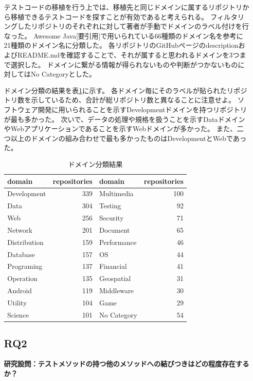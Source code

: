 \documentclass[conference]{IEEEtran}
\begin{document}
テストコードの移植を行う上では、移植先と同じドメインに属するリポジトリから移植できるテストコードを探すことが有効であると考えられる。
フィルタリングしたリポジトリのそれぞれに対して著者が手動でドメインのラベル付けを行なった。
Awesome Java[要引用]で用いられている66種類のドメイン名を参考に21種類のドメイン名に分類した。
各リポジトリのGitHubページのdescriptionおよびREADME.mdを確認することで、それが属すると思われるドメインを3つまで選択した。
ドメインに繋がる情報が得られないものや判断がつかないものに対してはNo Categoryとした。

ドメイン分類の結果を表\ref{tab:domain}に示す。
各ドメイン毎にそのラベルが貼られたリポジトリ数を示しているため、合計が総リポジトリ数と異なることに注意せよ。
ソフトウェア開発に用いられることを示すDevelopmentドメインを持つリポジトリが最も多かった。
次いで、データの処理や規格を扱うことを示すDataドメインやWebアプリケーションであることを示すWebドメインが多かった。
また、二つ以上のドメインの組み合わせで最も多かったものはDevelopmentとWebであった。

\begin{table}[t]
  \caption{ドメイン分類結果}
  \label{tab:domain}
  \centering
  \begin{tabular}{lr|lr} 
    \hline
domain & repositories & domain & repositories \\ \hline
Development & 339 & Multimedia & 100 \\
Data & 304 & Testing & 92 \\
Web & 256 & Security & 71 \\
Network & 201 & Document & 65 \\
Distribution & 159 & Performance & 46 \\
Database & 157 & OS & 44 \\
Programing & 137 & Financial & 41 \\
Operation & 135 & Geospatial & 31 \\
Android & 119 & Middleware & 30 \\
Utility & 104 & Game & 29 \\
Science & 101 & No Category & 54 \\ \hline
  \end{tabular}
\end{table}


\subsection{RQ2}
\textbf{研究設問：テストメソッドの持つ他のメソッドへの結びつきはどの程度存在するか？}
\end{document}

